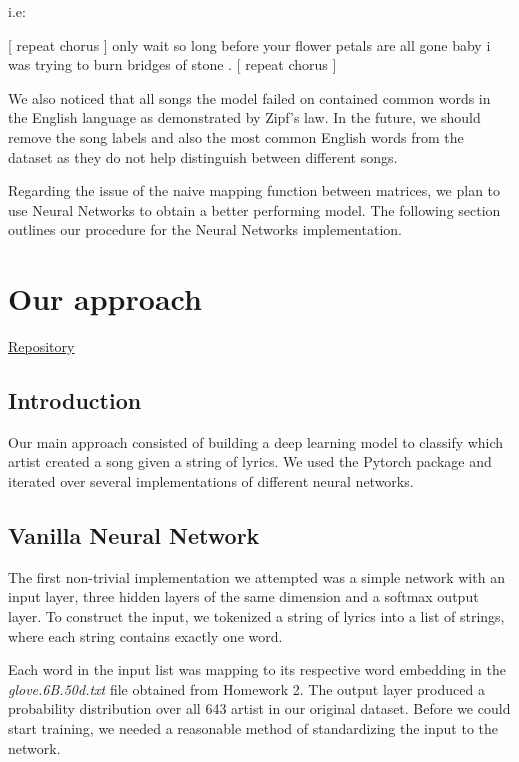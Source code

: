 \documentclass[11pt,a4paper]{article}
\begin{document}
i.e:


\begin{center}
[ repeat chorus ] 
only wait so long before your flower petals are all 
gone baby i was trying to burn bridges of stone 
. [ repeat chorus ]
\end{center}







We also noticed that all songs the model failed on contained common words in the English language as demonstrated by Zipf’s law. In the future, we should remove the song labels and also the most common English words from the dataset as they do not help distinguish between different songs. 

Regarding the issue of the naive mapping function between matrices, we plan to use Neural Networks to obtain a better performing model. The following section outlines our procedure for the Neural Networks implementation.
    
    \section{Our approach}

\begin{center}
 \href{https://github.com/onocy/nlp_f18/tree/rnn_pandas}{Repository}
\end{center}

\subsection{Introduction}
  Our main approach consisted of building a deep learning model to classify which artist created a song given a string of lyrics. We used the Pytorch package   and iterated over several implementations of different neural networks. 

\subsection{Vanilla Neural Network}

The first non-trivial implementation we attempted was a simple network with an input layer, three hidden layers of the same dimension and a softmax output layer. To construct the input, we tokenized a string of lyrics into a list of strings, where each string contains exactly one word.


 Each word in the input list was mapping to its respective word embedding in the \textit{glove.6B.50d.txt} file obtained from Homework 2. The output layer produced a probability distribution over all 643 artist in our original dataset. Before we could start training, we needed a reasonable method of standardizing the input to the network.
\end{document}
